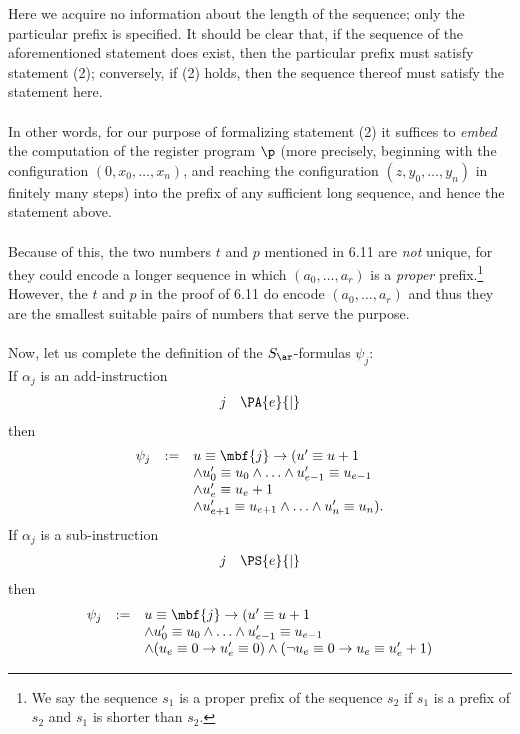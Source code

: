 \begin{enumerate}[1.]
Here we acquire no information about the length of the sequence; only the particular prefix is specified. It should be clear that, if the sequence of the aforementioned statement does exist, then the particular prefix must satisfy statement (2); conversely, if (2) holds, then the sequence thereof must satisfy the statement here.\\
\ \\
In other words, for our purpose of formalizing statement (2) it suffices to \emph{embed} the computation of the register program $\p$ (more precisely, beginning with the configuration $(0, x_0, \ldots, x_n)$, and reaching the configuration $(z, y_0, \ldots, y_n)$ in finitely many steps) into the prefix of any sufficient long sequence, and hence the statement above.\\
\ \\
Because of this, the two numbers $t$ and $p$ mentioned in 6.11 are \emph{not} unique, for they could encode a longer sequence in which $(a_0, \ldots, a_r)$ is a \emph{proper} prefix.\footnote{We say the sequence $s_1$ is a proper prefix of the sequence $s_2$ if $s_1$ is a prefix of $s_2$ and $s_1$ is shorter than $s_2$.} However, the $t$ and $p$ in the proof of 6.11 do encode $(a_0, \ldots, a_r)$ and thus they are the smallest suitable pairs of numbers that serve the purpose.\\
\ \\
Now, let us complete the definition of the $S_\ar$-formulas $\psi_j$:\\
If $\alpha_j$ is an add-instruction
\[
\begin{array}{ll}
j & \PA{e}{|}
\end{array}
\]
then
\[
\begin{array}{lll}
\psi_j & := & u \equiv \mbf{j} \rightarrow (u^\prime \equiv u + 1 \cr
\ & \ & \land u^\prime_0 \equiv u_0 \land \ldots \land u^\prime_{e - 1} \equiv u_{e - 1} \cr
\ & \ & \land u^\prime_e \equiv u_e + 1 \cr
\ & \ & \land u^\prime_{e + 1} \equiv u_{e + 1} \land \ldots \land u^\prime_n \equiv u_n).
\end{array}
\]
If $\alpha_j$ is a sub-instruction
\[
\begin{array}{ll}
j & \PS{e}{|}
\end{array}
\]
then
\[
\begin{array}{lll}
\psi_j & := & u \equiv \mbf{j} \rightarrow (u^\prime \equiv u + 1 \cr
\ & \ & \land u^\prime_0 \equiv u_0 \land \ldots \land u^\prime_{e - 1} \equiv u_{e - 1} \cr
\ & \ & \land (u_e \equiv 0 \rightarrow u^\prime_e \equiv 0) \land (\neg u_e \equiv 0 \rightarrow u_e \equiv u_e^\prime + 1) \cr

\end{array}\]
\end{enumerate}
